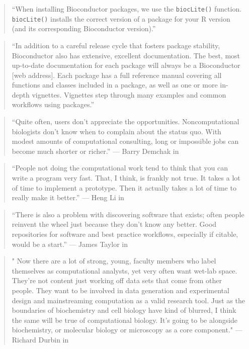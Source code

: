 \documentclass[]{tufte-book}
\begin{document}
\begin{quote}
``When installing Bioconductor packages, we use the \texttt{biocLite()} function. \texttt{biocLite()}
installs the correct version of a package for your R version (and its corresponding
Bioconductor version).'' \citep{buffalo2015bioinformatics}
\end{quote}

\begin{quote}
``In addition to a careful release cycle that fosters package stability, Bioconductor
also has extensive, excellent documentation. The best, most up-to-date documentation
for each package will always be a Bioconductor {[}web address{]}. Each package has a full
reference manual covering all functions and classes included in a package,
as well as one or more in-depth vignettes. Vignettes step through many examples and
common workflows using packages.'' \citep{buffalo2015bioinformatics}
\end{quote}

\begin{quote}
``Quite often, users don't appreciate the opportunities. Noncomputational
biologists don't know when to complain about the status quo. With modest amounts
of computational consulting, long or impossible jobs can become much shorter or
richer.'' --- Barry Demchak in \citep{altschul2013anatomy}
\end{quote}

\begin{quote}
``People not doing the computational work tend to think that you can write a
program very fast. That, I think, is frankly not true. It takes a lot of time to
implement a prototype. Then it actually takes a lot of time to really make it
better.'' --- Heng Li in \citep{altschul2013anatomy}
\end{quote}

\begin{quote}
``There is also a problem with discovering software that exists; often people
reinvent the wheel just because they don't know any better. Good repositories
for software and best practice workflows, especially if citable, would be a
start.'' --- James Taylor in \citep{altschul2013anatomy}
\end{quote}

\begin{quote}
" Now there are a lot of strong, young, faculty members who label themselves
as computational analysts, yet very often want wet-lab space. They're not
content just working off data sets that come from other people. They want to be
involved in data generation and experimental design and mainstreaming
computation as a valid research tool. Just as the boundaries of biochemistry and
cell biology have kind of blurred, I think the same will be true of
computational biology. It's going to be alongside biochemistry, or molecular
biology or microscopy as a core component." --- Richard Durbin in
\citep{altschul2013anatomy}
\end{quote}
\end{document}
